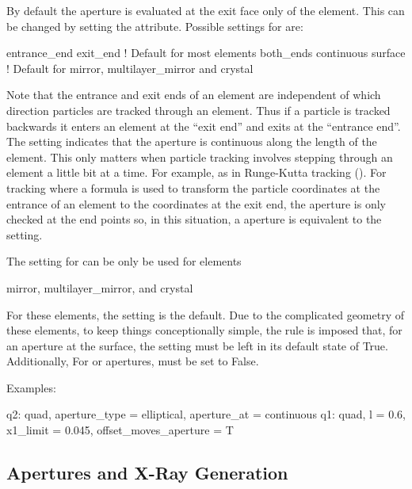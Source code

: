 By default the aperture is evaluated at the exit face only of the
element. This can be changed by setting the  attribute.
Possible settings for  are:
\begin{example}
  entrance_end
  exit_end       ! Default for most elements
  both_ends
  continuous
  surface        ! Default for mirror, multilayer_mirror and crystal
\end{example}
Note that the entrance and exit ends of an element are independent of
which direction particles are tracked through an element. Thus if a
particle is tracked backwards it enters an element at the ``exit end''
and exits at the ``entrance end''. The  setting
indicates that the aperture is continuous along the length of the
element. This only matters when particle tracking involves stepping
through an element a little bit at a time. For example, as in
Runge-Kutta tracking (). For tracking where a formula is
used to transform the particle coordinates at the entrance of an
element to the coordinates at the exit end, the aperture is only
checked at the end points so, in this situation, a 
aperture is equivalent to the  setting.

The  setting for  can be only be used for
elements
\begin{example}
  mirror, 
  multilayer_mirror, and 
  crystal
\end{example}
For these elements, the  setting is the default. Due to
the complicated geometry of these elements, to keep things
conceptionally simple, the rule is imposed that, for an aperture at the
surface, the  setting must be left in its
default state of True. Additionally, For  or
 apertures,  must be set to
False.

Examples:
\begin{example}
  q2: quad, aperture_type = elliptical, aperture_at = continuous
  q1: quad, l = 0.6, x1_limit = 0.045, offset_moves_aperture = T
\end{example}

\subsection{Apertures and X-Ray Generation}
\label{s:aper.x.ray}

